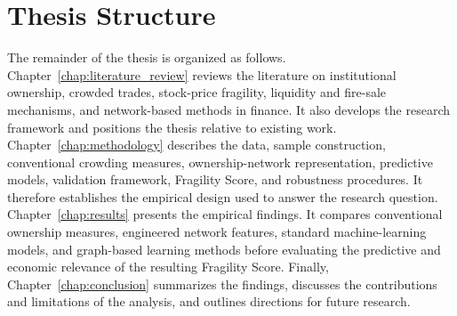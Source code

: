 \section{Thesis Structure}
\label{sec:thesis_structure}

The remainder of the thesis is organized as follows. Chapter~\ref{chap:literature_review} reviews the literature on institutional ownership, crowded trades, stock-price fragility, liquidity and fire-sale mechanisms, and network-based methods in finance. It also develops the research framework and positions the thesis relative to existing work. Chapter~\ref{chap:methodology} describes the data, sample construction, conventional crowding measures, ownership-network representation, predictive models, validation framework, Fragility Score, and robustness procedures. It therefore establishes the empirical design used to answer the research question. Chapter~\ref{chap:results} presents the empirical findings. It compares conventional ownership measures, engineered network features, standard machine-learning models, and graph-based learning methods before evaluating the predictive and economic relevance of the resulting Fragility Score. Finally, Chapter~\ref{chap:conclusion} summarizes the findings, discusses the contributions and limitations of the analysis, and outlines directions for future research.